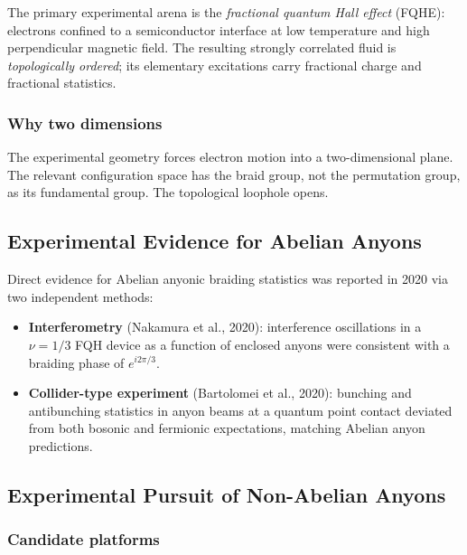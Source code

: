 \documentclass[11pt,a4paper]{article}
\begin{document}
The primary experimental arena is the \emph{fractional quantum Hall effect}
(FQHE): electrons confined to a semiconductor interface at low temperature
and high perpendicular magnetic field.  The resulting strongly correlated
fluid is \emph{topologically ordered}; its elementary excitations carry
fractional charge and fractional statistics.

\subsubsection{Why two dimensions}

The experimental geometry forces electron motion into a two-dimensional plane.
The relevant configuration space has the braid group, not the permutation
group, as its fundamental group.  The topological loophole opens.

\subsection{Experimental Evidence for Abelian Anyons}

Direct evidence for Abelian anyonic braiding statistics was reported in 2020
via two independent methods:
\begin{itemize}
  \item \textbf{Interferometry} (Nakamura et al., 2020): interference
        oscillations in a $\nu = 1/3$ FQH device as a function of enclosed
        anyons were consistent with a braiding phase of $e^{i2\pi/3}$.
  \item \textbf{Collider-type experiment} (Bartolomei et al., 2020): bunching
        and antibunching statistics in anyon beams at a quantum point contact
        deviated from both bosonic and fermionic expectations, matching
        Abelian anyon predictions.
\end{itemize}

\subsection{Experimental Pursuit of Non-Abelian Anyons}

\subsubsection{Candidate platforms}
\end{document}
